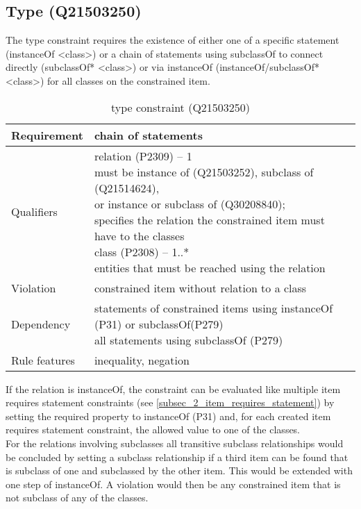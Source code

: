 \documentclass[hyperref,bachelorofscience,fleqn]{cgvpub}
\begin{document}
\subsection{Type (Q21503250)}\label{subsec_2_type}
The type constraint requires the existence of either one of a specific statement (instanceOf <class>) or a chain of statements using subclassOf to connect directly (subclassOf* <class>)
or via instanceOf (instanceOf/subclassOf* <class>) for all classes on the constrained item.
\begin{table}[H]
\caption{type constraint (Q21503250)}
\begin{tabularx}{\textwidth}{ ll X}
\hline
Requirement & chain of statements \\
\hline
Qualifiers & \makecell{relation (P2309) -- 1 \\ must be instance of (Q21503252), subclass of (Q21514624), \\ or instance or subclass of (Q30208840); \\ specifies the relation the constrained item must have to the classes\\
class (P2308) -- 1..* \\ entities that must be reached using the relation} \\
\hline
Violation & constrained item without relation to a class \\
\hline
Dependency & \makecell{statements of constrained items using instanceOf (P31) or subclassOf(P279) \\ all statements using subclassOf (P279) }\\
\hline
Rule features & inequality, negation \\
\hline
\end{tabularx}
\end{table}

If the relation is instanceOf, the constraint can be evaluated like multiple item requires statement constraints (see \ref{subsec_2_item_requires_statement}) by setting the required property to instanceOf (P31) and, for each created item requires statement constraint, the allowed value to one of the classes. \\
For the relations involving subclasses all transitive subclass relationships would be concluded by setting a subclass relationship if a third item can be found that is subclass of one and subclassed by the other item. This would be extended with one step of instanceOf. A violation would then be any constrained item that is not subclass of any of the classes.
\end{document}
